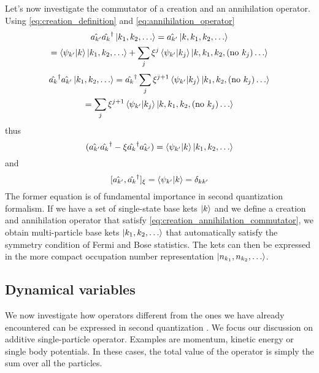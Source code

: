 Let's now investigate the commutator of a creation and an annihilation operator. Using \cref{eq:creation_definition} and  \cref{eq:annihilation_operator}
\begin{multline}
    \hat{a_{k'}}\hat{a_{k}}^\dagger \ket{k_1, k_2, \dots}
    = \hat{a_{k'}} \ket{k,k_1, k_2, \dots}
    \\= \braket{\psi_{k'}}{k} \ket{k_1, k_2, \dots}
    +    \sum_{j} \xi^{j} \braket{\psi_{k'}}{k_j} \ket{k,k_1, k_2, (\text{no } k_j) \dots}
\end{multline}
\begin{multline}
    \hat{a_{k}}^\dagger\hat{a_{k'}} \ket{k_1, k_2, \dots}
    = \hat{a_{k}}^\dagger \sum_{j} \xi^{j+1} \braket{\psi_{k'}}{k_j} \ket{k_1, k_2, (\text{no } k_j) \dots}
    \\= \sum_{j} \xi^{j+1} \braket{\psi_{k'}}{k_j} \ket{k,k_1, k_2, (\text{no } k_j) \dots}
\end{multline}
thus
\begin{equation}
    (\hat{a_{k'}}\hat{a_{k}}^\dagger -\xi  \hat{a_{k}}^\dagger\hat{a_{k'}}) = \braket{\psi_{k'}}{k} \ket{k_1, k_2, \dots}
\end{equation}
and
\begin{equation} \label{eq:creation_annihilation_commutator}
    [\hat{a_{k'}}, \hat{a_k}^\dagger]_\xi = \braket{\psi_{k'}}{k} = \delta_{kk'}
\end{equation}
The former equation is of fundamental importance in second quantization formalism. If we have a set of single-state base kets $\ket{k}$ and we define a creation and annihilation operator that satisfy \cref{eq:creation_annihilation_commutator}, we obtain multi-particle base kets $\ket{k_1, k_2, \dots}$ that automatically satisfy the symmetry condition of Fermi and Bose statistics. The kets can then be expressed in the more compact occupation number representation $\ket{n_{k_1}, n_{k_2}, \dots}$.

\subsection{Dynamical variables}
We now investigate how operators different from the ones we have already encountered can be expressed in second quantization \cite{sakurai2020}. We focus our discussion on additive single-particle operator. Examples are momentum, kinetic energy or single body potentials. In these cases, the total value of the operator is simply the sum over all the particles.

